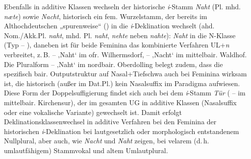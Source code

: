 Ebenfalls in additive Klassen wechseln der historische \textit{i}{}-Stamm \textit{Naht} (Pl. mhd. \textit{næte}) sowie \textit{Nacht}, historisch ein fem. Wurzelstamm, der bereits im Althochdeutschen „spurenweise“ (\citealt[§241]{BrauneHeidermanns2018}) in die \textit{i}{}-Deklination wechselt (ahd. Nom./Akk.Pl. \textit{naht}, mhd. Pl. \textit{naht}, \textit{nehte} neben \textit{nahte}): \textit{Naht} in die N-Klasse (Typ  -- ), daneben ist für beide Feminina das kombinierte Verfahren UL+\textit{n} verbreitet, z.\,B.  --  ‚Naht‘ im ofr. Wilhermsdorf,  --  ‚Nacht‘ im mittelbair. Waldhof. Die Pluralform  --  ‚Naht‘ im nordbair. Oberdolling belegt zudem, dass die spezifisch bair. Outputstruktur auf Nasal+Tiefschwa auch bei Feminina wirksam ist, die historisch (außer im Dat.Pl.) kein Nasalsuffix im Paradigma aufwiesen. Diese Form der Doppelsuffigierung findet sich auch bei dem \textit{i}{}-Stamm \textit{Tür} (  --  im mittelbair. Kirchensur), der im gesamten UG in additive Klassen (Nasalsuffix oder eine vokalische Variante) gewechselt ist. Damit erfolgt Deklinationsklassenwechsel in additive Verfahren bei den Feminina der historischen \textit{i}{}-Deklination bei lautgesetzlich oder morphologisch entstandenem Nullplural, aber auch, wie \textit{Nacht} und \textit{Naht} zeigen, bei velarem (d.\,h. umlautfähigem) Stammvokal und altem Umlautplural.

